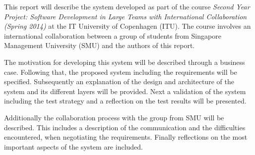\documentclass[../report.tex]{subfiles}
\begin{document}
This report will describe the system developed as part of the course \textit{Second Year Project: Software Development in Large Teams with International Collaboration (Spring 2014)} at the IT University of Copenhagen (ITU). The course involves an international collaboration between a group of students from Singapore Management University (SMU) and the authors of this report.

The motivation for developing this system will be described through a business case. Following that, the proposed system including the requirements will be specified. Subsequently an explanation of the design and architecture of the system and its different layers will be provided. Next a validation of the system including the test strategy and a reflection on the test results will be presented. 

Additionally the collaboration process with the group from SMU will be described. This includes a description of the communication and the difficulties encountered, when negotiating the requirements. Finally reflections on the most important aspects of the system are included.




\end{document}
